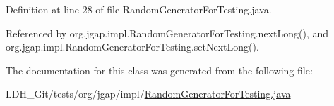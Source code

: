 Definition at line 28 of file Random\-Generator\-For\-Testing.\-java.



Referenced by org.\-jgap.\-impl.\-Random\-Generator\-For\-Testing.\-next\-Long(), and org.\-jgap.\-impl.\-Random\-Generator\-For\-Testing.\-set\-Next\-Long().



The documentation for this class was generated from the following file\-:\begin{DoxyCompactItemize}
\item 
L\-D\-H\-\_\-\-Git/tests/org/jgap/impl/\hyperlink{_random_generator_for_testing_8java}{Random\-Generator\-For\-Testing.\-java}\end{DoxyCompactItemize}
